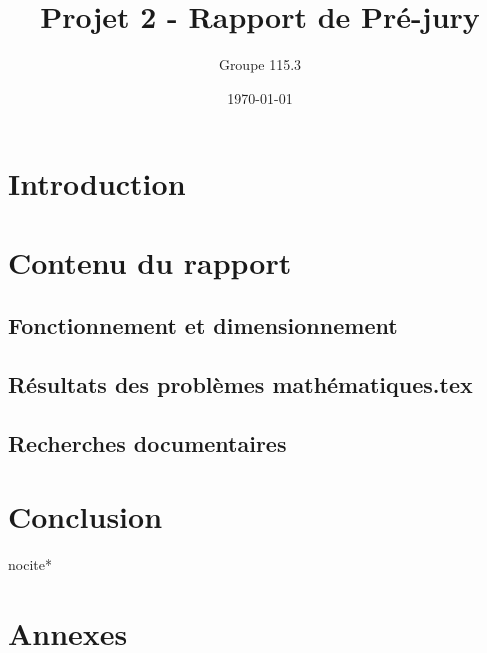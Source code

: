 \documentclass{report}
\title{Projet 2 - Rapport de Pré-jury}
\author{Groupe 115.3}
\date{\today}
\begin{document}
\maketitle
\tableofcontents

\part{Introduction}

\part{Contenu du rapport}

\chapter{Fonctionnement et dimensionnement}





\chapter{Résultats des problèmes mathématiques.tex}





\chapter{Recherches documentaires}





\part{Conclusion}

\clearpage

nocite{*} 



\appendix
\part{Annexes}





%
\end{document}
